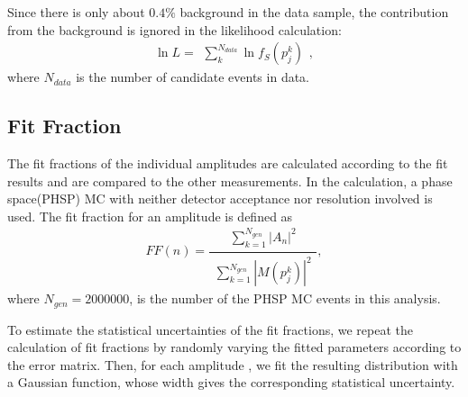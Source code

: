 {    Since there is only about $0.4\%$ background in the data sample, the contribution from the background is ignored in the likelihood calculation:
    \begin{equation}
    \ln L = \begin{matrix}\sum_{k}^{N_{data}} \ln f_{S}(p_{j}^{k})\end{matrix},  \label{likelihood}
    \end{equation}
    where $N_{data}$ is the number of candidate events in data.
}


\subsection{Fit Fraction}
\par{
The fit fractions of the individual amplitudes are calculated according to the fit results and are compared to the other measurements. In the calculation, a phase space(PHSP) MC with neither detector acceptance nor resolution involved is used. The fit fraction for an amplitude is defined as
    \begin{equation}
    FF(n) = \frac{\begin{matrix}\sum_{k=1}^{N_{gen}} \left|A_{n}\right|^{2}\end{matrix}}{\begin{matrix}\sum_{k=1}^{N_{gen}} \left|M(p_{j}^{k})\right|^{2}\end{matrix}}, \label{Fit-Fraction-Definition}
    \end{equation}
    where $N_{gen} = 2000000$, is the number of the PHSP MC events in this analysis. 

    To estimate the statistical uncertainties of the fit fractions, we repeat the calculation of fit fractions by randomly varying the fitted parameters according to the error matrix. Then, for each amplitude , we fit the resulting distribution with a Gaussian function, whose width gives the corresponding statistical uncertainty.
}

